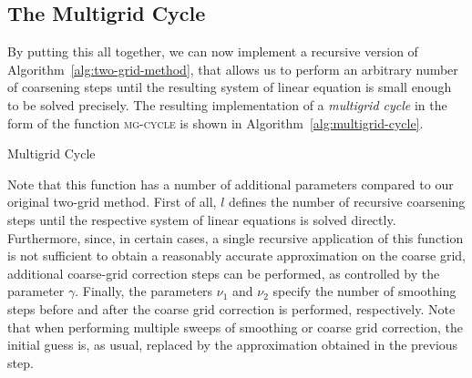 \subsection{The Multigrid Cycle}\label{sec:multigrid-cycles}
By putting this all together, we can now implement a recursive version of Algorithm~\ref{alg:two-grid-method}, that allows us to perform an arbitrary number of coarsening steps until the resulting system of linear equation is small enough to be solved precisely.
The resulting implementation of a \emph{multigrid cycle} in the form of the function \textsc{mg-cycle} is shown in Algorithm~\ref{alg:multigrid-cycle}.
\begin{algorithm}[h]
	\caption{Multigrid Cycle}
	\label{alg:multigrid-cycle}
	\begin{algorithmic}
		\EndFor
		\Else
		\EndFor
		\EndIf
		\EndFor
		\State {}
		\EndFunction
	\end{algorithmic}
\end{algorithm}
Note that this function has a number of additional parameters compared to our original two-grid method.
First of all, $l$ defines the number of recursive coarsening steps until the respective system of linear equations is solved directly.
Furthermore, since, in certain cases, a single recursive application of this function is not sufficient to obtain a reasonably accurate approximation on the coarse grid, additional coarse-grid correction steps can be performed, as controlled by the parameter $\gamma$.
Finally, the parameters $\nu_1$ and $\nu_2$ specify the number of smoothing steps before and after the coarse grid correction is performed, respectively.
Note that when performing multiple sweeps of smoothing or coarse grid correction, the initial guess is, as usual, replaced by the approximation obtained in the previous step.
